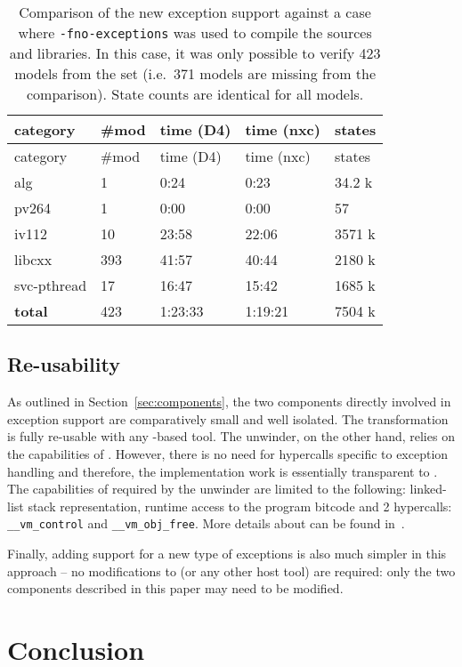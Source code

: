 \begin{table}[tp]
\caption{\label{tbl:D4nxc}Comparison of the new exception support
against a case where \texttt{-fno-exceptions} was used to compile the
sources and libraries. In this case, it was only possible to verify 423
models from the set (i.e.~371 models are missing from the comparison).
State counts are identical for all models. }
\begin{tabularx}{\textwidth}{lllll}
\toprule
category & \#mod & time (D4) & time (nxc) & states\tabularnewline
\midrule
\toprule
category & \#mod & time (D4) & time (nxc) & states\tabularnewline
\midrule
alg & 1 & 0:24 & 0:23 & 34.2 k\tabularnewline
pv264 & 1 & 0:00 & 0:00 & 57\tabularnewline
iv112 & 10 & 23:58 & 22:06 & 3571 k\tabularnewline
libcxx & 393 & 41:57 & 40:44 & 2180 k\tabularnewline
svc-pthread & 17 & 16:47 & 15:42 & 1685 k\tabularnewline
\textbf{total} & 423 & 1:23:33 & 1:19:21 & 7504 k\tabularnewline
\bottomrule
\end{tabularx}
\end{table}

\subsection{Re-usability}\label{re-usability}

As outlined in Section~\ref{sec:components}, the two components directly
involved in exception support are comparatively small and well isolated.
The \llvm{} transformation is fully re-usable with any \llvm{}-based tool. The
unwinder, on the other hand, relies on the capabilities of \divm{}.
However, there is no need for hypercalls specific to exception handling
and therefore, the implementation work is essentially transparent to
\divm{}. The capabilities of \divm{} required by the unwinder are limited to
the following: linked-list stack representation, runtime access to the
program bitcode and 2 hypercalls: \texttt{\_\_vm\_control} and
\texttt{\_\_vm\_obj\_free}. More details about \divm{} can be found
in~\cite{rockai17:divm}.

Finally, adding support for a new type of exceptions is also much
simpler in this approach -- no modifications to \divm{} (or any other host
tool) are required: only the two components described in this paper may
need to be modified.

\section{Conclusion}\label{sec:conclusion}

